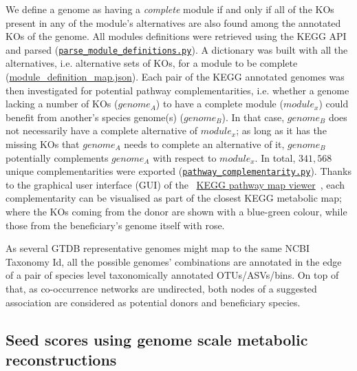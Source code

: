 \documentclass[sn-mathphys,Numbered]{sn-jnl}%
\theoremstyle{thmstyleone}%
\theoremstyle{thmstyletwo}%
\theoremstyle{thmstylethree}%
\begin{document}
        We define a genome as having a \textit{complete} module if and only if all of the KOs present in any of the module's alternatives are also found among the annotated KOs of the genome.
        All modules definitions were retrieved using the KEGG API and parsed 
        (\href{https://github.com/hariszaf/microbetag/blob/develop/microbetagDB/mappings/kegg_mappings/parse_module_definitions.py}{\texttt{parse\_module\_definitions.py}}).
        A dictionary was built with all the alternatives, i.e. alternative sets of KOs, for a module to be complete 
        (\href{https://github.com/hariszaf/microbetag/blob/develop/microbetagDB/mappings/kegg_mappings/module_definition_map.json}{module\_definition\_map.json}).
        Each pair of the KEGG annotated genomes was then investigated for potential pathway complementarities, 
        i.e. whether a genome lacking a number of KOs ($genome_A$) to have a complete module ($module_x$) could benefit from another's species genome(s) ($genome_B$).
        In that case, $genome_B$ does not necessarily have a complete alternative of $module_x$; as long as it has the missing KOs that $genome_A$ needs to complete an alternative of it, $genome_B$ potentially complements $genome_A$ with respect to $module_x$.
        In total, $341,568$ unique complementarities were exported (\href{https://github.com/hariszaf/microbetag/blob/develop/microbetagDB/scripts/pathway_complementarity.py}{\texttt{pathway\_complementarity.py}}).
        Thanks to the graphical user interface (GUI) of the ~\href{https://www.kegg.jp/kegg/docs/color_gui.html}{KEGG pathway map viewer}~\cite{kanehisa2020kegg,kanehisa2022kegg}, 
        each complementarity can be visualised as part of the closest KEGG metabolic map; 
        where the KOs coming from the donor are shown with a blue-green colour, while those from the beneficiary's genome itself with rose.

        As several GTDB representative genomes might map to the same NCBI Taxonomy Id, all the possible genomes' combinations are annotated in the edge of a pair of species level taxonomically annotated OTUs/ASVs/bins.
        On top of that, as co-occurrence networks are undirected, both nodes of a suggested association are considered as potential donors and beneficiary species. 
        
        


    \subsection*{ Seed scores using genome scale metabolic reconstructions }
        \label{subsec:seeds}
\end{document}
